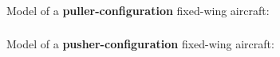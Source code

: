 \documentclass[ 10pt, xcolor = dvipsnames]{beamer}
\begin{document}
\begin{frame}[allowframebreaks]
\frametitle{\insertsection}

Model of a \textbf{puller-configuration} fixed-wing aircraft: 
\begin{figure}[htb]
\centering
\def\svgwidth{\columnwidth}

\end{figure}

\end{frame}

\begin{frame}[allowframebreaks]
\frametitle{\insertsection}

Model of a \textbf{pusher-configuration} fixed-wing aircraft: 
\begin{figure}[htb]
\centering
\def\svgwidth{\columnwidth}

\end{figure}

\end{frame}
\end{document}
